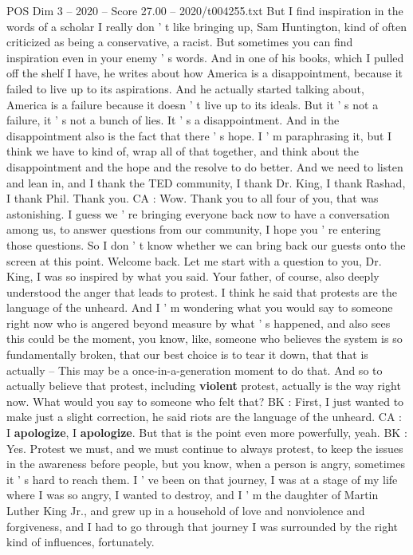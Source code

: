 \begin{textsample}{POS Dim 3 – 2020 – Score 27.00 – 2020/t004255.txt}
But I find inspiration in the words of a scholar I really don ' t like bringing up, Sam Huntington, kind of often criticized as being a conservative, a racist.
But sometimes you can find inspiration even in your enemy ' s words.
And in one of his books, which I pulled off the shelf I have, he writes about how America is a disappointment, because it failed to live up to its aspirations.
And he actually started talking about, America is a failure because it doesn ' t live up to its ideals.
But it ' s not a failure, it ' s not a bunch of lies.
It ' s a disappointment.
And in the disappointment also is the fact that there ' s hope.
I ' m paraphrasing it, but I think we have to kind of, wrap all of that together, and think about the disappointment and the hope and the resolve to do better.
And we need to listen and lean in, and I thank the TED community, I thank Dr.
King, I thank Rashad, I thank Phil.
Thank you.
CA : Wow.
Thank you to all four of you, that was astonishing.
I guess we ' re bringing everyone back now to have a conversation among us, to answer questions from our community, I hope you ' re entering those questions.
So I don ' t know whether we can bring back our guests onto the screen at this point.
Welcome back.
Let me start with a question to you, Dr.
King, I was so inspired by what you said.
Your father, of course, also deeply understood the anger that leads to protest.
I think he said that protests are the language of the unheard.
And I ' m wondering what you would say to someone right now who is angered beyond measure by what ' s happened, and also sees this could be the moment, you know, like, someone who believes the system is so fundamentally broken, that our best choice is to tear it down, that that is actually -- This may be a once-in-a-generation moment to do that.
And so to actually believe that protest, including \textbf{violent} protest, actually is the way right now.
What would you say to someone who felt that?
BK : First, I just wanted to make just a slight correction, he said riots are the language of the unheard.
CA : I \textbf{apologize}, I \textbf{apologize}.
But that is the point even more powerfully, yeah.
BK : Yes.
Protest we must, and we must continue to always protest, to keep the issues in the awareness before people, but you know, when a person is angry, sometimes it ' s hard to reach them.
I ' ve been on that journey, I was at a stage of my life where I was so angry, I wanted to destroy, and I ' m the daughter of Martin Luther King Jr., and grew up in a household of love and nonviolence and forgiveness, and I had to go through that journey I was surrounded by the right kind of influences, fortunately.

\end{textsample}
